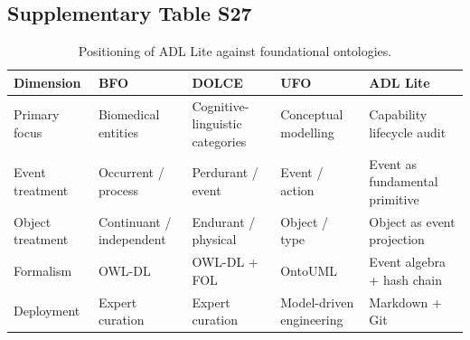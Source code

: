 \subsection{Supplementary Table S27}\label{tab:S27}
\begin{table}[htbp]
\centering
\caption{Positioning of ADL Lite against foundational ontologies.}
\label{tab:foundational-positioning}
\begin{tabular}{@{}p{2.8cm}p{2.8cm}p{2.8cm}p{2.8cm}p{2.8cm}@{}}
\toprule
\textbf{Dimension} & \textbf{BFO} & \textbf{DOLCE} & \textbf{UFO} & \textbf{ADL Lite} \\
\midrule
Primary focus & Biomedical entities & Cognitive-linguistic categories & Conceptual modelling & Capability lifecycle audit \\
Event treatment & Occurrent / process & Perdurant / event & Event / action & Event as fundamental primitive \\
Object treatment & Continuant / independent & Endurant / physical & Object / type & Object as event projection \\
Formalism & OWL-DL & OWL-DL + FOL & OntoUML & Event algebra + hash chain \\
Deployment & Expert curation & Expert curation & Model-driven engineering & Markdown + Git \\
\bottomrule
\end{tabular}
\end{table}

